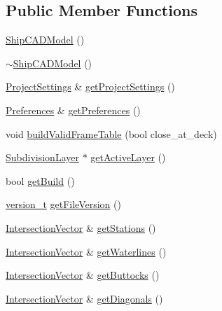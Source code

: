 \subsection*{Public Member Functions}
\begin{DoxyCompactItemize}
\item 
\hyperlink{classShipCAD_1_1ShipCADModel_abede72e53058c2ecf8dc2c4b2a7c8014}{Ship\-C\-A\-D\-Model} ()
\item 
\hyperlink{classShipCAD_1_1ShipCADModel_a69faa69f492a5aad941990319e5e88c0}{$\sim$\-Ship\-C\-A\-D\-Model} ()
\item 
\hyperlink{classShipCAD_1_1ProjectSettings}{Project\-Settings} \& \hyperlink{classShipCAD_1_1ShipCADModel_a94a8eed8ac8ff4ad8287a0a1113e3271}{get\-Project\-Settings} ()
\item 
\hyperlink{classShipCAD_1_1Preferences}{Preferences} \& \hyperlink{classShipCAD_1_1ShipCADModel_aa6af8872deba5b401ac575a85901a265}{get\-Preferences} ()
\item 
void \hyperlink{classShipCAD_1_1ShipCADModel_abb435e62fccca913acb2331f82abce93}{build\-Valid\-Frame\-Table} (bool close\-\_\-at\-\_\-deck)
\item 
\hyperlink{classShipCAD_1_1SubdivisionLayer}{Subdivision\-Layer} $\ast$ \hyperlink{classShipCAD_1_1ShipCADModel_a5aa1e9aa14350f2e0980112a81613ca6}{get\-Active\-Layer} ()
\item 
bool \hyperlink{classShipCAD_1_1ShipCADModel_ae6f7a30aee95cc1bf1d0967073dc9595}{get\-Build} ()
\item 
\hyperlink{namespaceShipCAD_af3a6fa23a7318acbda7b0066b53d694f}{version\-\_\-t} \hyperlink{classShipCAD_1_1ShipCADModel_a17ecfdd29efc03ed2580b89f5da955c8}{get\-File\-Version} ()
\item 
\hyperlink{classShipCAD_1_1IntersectionVector}{Intersection\-Vector} \& \hyperlink{classShipCAD_1_1ShipCADModel_a86da3ca66e90403ead21ccc67f584c52}{get\-Stations} ()
\item 
\hyperlink{classShipCAD_1_1IntersectionVector}{Intersection\-Vector} \& \hyperlink{classShipCAD_1_1ShipCADModel_a6c147a75fa02e43145de346efb9542fd}{get\-Waterlines} ()
\item 
\hyperlink{classShipCAD_1_1IntersectionVector}{Intersection\-Vector} \& \hyperlink{classShipCAD_1_1ShipCADModel_a8908d7adff0b1aa1ed118103c02c5402}{get\-Buttocks} ()
\item 
\hyperlink{classShipCAD_1_1IntersectionVector}{Intersection\-Vector} \& \hyperlink{classShipCAD_1_1ShipCADModel_a19864f7628c596553f7c89247715b10a}{get\-Diagonals} ()

\end{DoxyCompactItemize}
